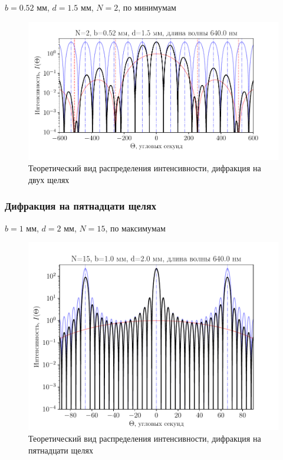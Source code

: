 \begin{table}[H]
	    \caption{$b=0.52$ мм, $d=1.5$ мм, $N=2$, по минимумам}
	    \label{tab:chem1} 
	\xdef\deltaG{0} 
	\xdef\deltaM{0}
	\xdef\deltaS{992627}
	\mytable
	
\end{table}
\begin{figure}[H]
	\centering
	\includegraphics[]{plot/N2}
	\caption{Теоретический вид распределения интенсивности, дифракция на двух щелях}
	\label{fig:figure1}
\end{figure}
\subsubsection{Дифракция на пятнадцати щелях}
\begin{table}[H]
	    \caption{$b=1$ мм, $d=2$ мм, $N=15$, по максимумам}
	    \label{tab:chem1}
	\xdef\deltaG{275} 
	\xdef\deltaM{51}
	\xdef\deltaS{4}
	\mytable
	
\end{table}
\begin{figure}[H]
	\centering
	\includegraphics[]{plot/N15}
	\caption{Теоретический вид распределения интенсивности, дифракция на пятнадцати щелях}
	\label{fig:figure1}
\end{figure}



